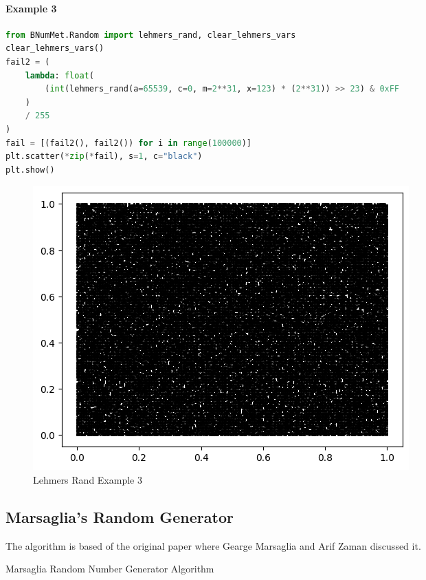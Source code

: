 \paragraph{Example 3}{
\begin{lstlisting}[language=Python]
from BNumMet.Random import lehmers_rand, clear_lehmers_vars
clear_lehmers_vars()
fail2 = (
    lambda: float(
        (int(lehmers_rand(a=65539, c=0, m=2**31, x=123) * (2**31)) >> 23) & 0xFF
    )
    / 255
)
fail = [(fail2(), fail2()) for i in range(100000)]
plt.scatter(*zip(*fail), s=1, c="black")
plt.show()
\end{lstlisting}
\begin{figure}[H]
    \centering
    \includegraphics{Include/Images/Thesis/Documentation/Randomness/Lehmers Rand Example 3.png}
    \caption{Lehmers Rand Example 3}
    \label{fig:Lehmers Rand Example 3}
\end{figure}
}

\subsection{Marsaglia's Random Generator}
The algorithm is based of \cite{10.1214/aoap/1177005878} the original paper where Gearge Marsaglia and Arif Zaman discussed it.

\begin{algorithm}[H]
\SetAlgoLined
 
 \caption{Marsaglia Random Number Generator Algorithm}
\end{algorithm}

